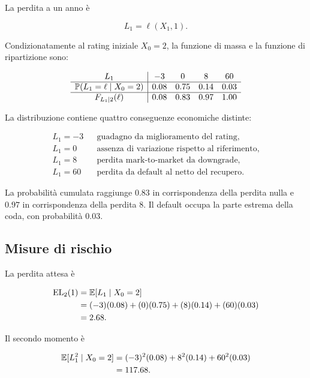\label{subsec:cap9-applicazione-distribuzione-perdita}

La perdita a un anno \`{e}

\[
L_1
=
\ell(X_1,1).
\]

Condizionatamente al rating iniziale $X_0=2$, la funzione di massa e la
funzione di ripartizione sono:

\[
\begin{array}{c|cccc}
L_1
&
-3
&
0
&
8
&
60
\\
\hline
\mathbb{P}(L_1=\ell\mid X_0=2)
&
0.08
&
0.75
&
0.14
&
0.03
\\
\hline
F_{L_1\mid 2}(\ell)
&
0.08
&
0.83
&
0.97
&
1.00
\end{array}
\]

La distribuzione contiene quattro conseguenze economiche distinte:

\[
\begin{array}{lll}
L_1=-3
&
&
\text{guadagno da miglioramento del rating,}
\\[1mm]
L_1=0
&
&
\text{assenza di variazione rispetto al riferimento,}
\\[1mm]
L_1=8
&
&
\text{perdita mark-to-market da downgrade,}
\\[1mm]
L_1=60
&
&
\text{perdita da default al netto del recupero.}
\end{array}
\]

La probabilit\`{a} cumulata raggiunge $0.83$ in corrispondenza della
perdita nulla e $0.97$ in corrispondenza della perdita $8$. Il default
occupa la parte estrema della coda, con probabilit\`{a} $0.03$.

\subsection{Misure di rischio}

\label{subsec:cap9-applicazione-misure-rischio}

La perdita attesa \`{e}

\[
\begin{split}
\mathrm{EL}_2(1)
&=
\mathbb{E}[L_1\mid X_0=2]
\\
&=
(-3)(0.08)
+
(0)(0.75)
+
(8)(0.14)
+
(60)(0.03)
\\
&=
2.68.
\end{split}
\]

Il secondo momento \`{e}

\[
\begin{split}
\mathbb{E}[L_1^2\mid X_0=2]
&=
(-3)^2(0.08)
+
8^2(0.14)
+
60^2(0.03)
\\
&=
117.68.
\end{split}
\]


